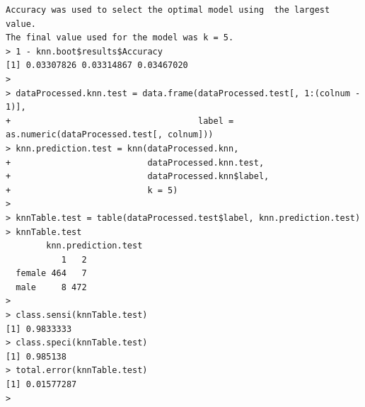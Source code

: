 \documentclass{article}%
\begin{document}
\begin{verbatim}
Accuracy was used to select the optimal model using  the largest value.
The final value used for the model was k = 5.
> 1 - knn.boot$results$Accuracy
[1] 0.03307826 0.03314867 0.03467020
> 
> dataProcessed.knn.test = data.frame(dataProcessed.test[, 1:(colnum - 1)],
+                                     label = as.numeric(dataProcessed.test[, colnum]))
> knn.prediction.test = knn(dataProcessed.knn,
+                           dataProcessed.knn.test,
+                           dataProcessed.knn$label,
+                           k = 5)
>
> knnTable.test = table(dataProcessed.test$label, knn.prediction.test)
> knnTable.test
        knn.prediction.test
           1   2
  female 464   7
  male     8 472
>
> class.sensi(knnTable.test)
[1] 0.9833333
> class.speci(knnTable.test)
[1] 0.985138
> total.error(knnTable.test)
[1] 0.01577287
> \end{verbatim}
\end{document}
